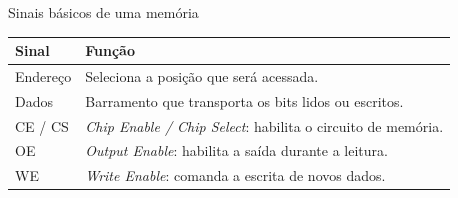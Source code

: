 \begin{frame}[t]{Sinais básicos de uma memória}
  \small
  \setlength{\tabcolsep}{4pt}
  \begin{tabular}{>{\raggedright\arraybackslash}p{} p{}}
    \toprule
    \textbf{Sinal} & \textbf{Função} \\
    \midrule
    Endereço & Seleciona a posição que será acessada. \\
    Dados & Barramento que transporta os bits lidos ou escritos. \\
    CE / CS & \textit{Chip Enable / Chip Select}: habilita o circuito de memória. \\
    OE & \textit{Output Enable}: habilita a saída durante a leitura. \\
    WE & \textit{Write Enable}: comanda a escrita de novos dados. \\
    \bottomrule
  \end{tabular}
\end{frame}
